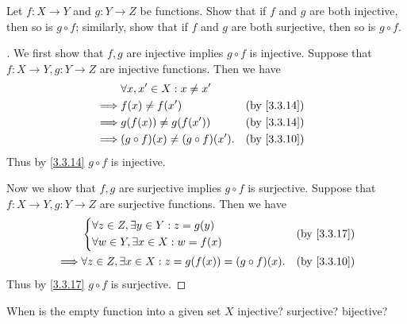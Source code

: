 \begin{ex}\label{ex:3.3.2}
  Let \(f : X \to Y\) and \(g : Y \to Z\) be functions.
  Show that if \(f\) and \(g\) are both injective, then so is \(g \circ f\);
  similarly, show that if \(f\) and \(g\) are both surjective, then so is \(g \circ f\).
\end{ex}

\begin{proof}[]
  We first show that \(f, g\) are injective implies \(g \circ f\) is injective.
  Suppose that \(f : X \to Y, g : Y \to Z\) are injective functions.
  Then we have
  \begin{align*}
             & \forall x, x' \in X : x \neq x'                       \\
    \implies & f(x) \neq f(x')                      &  & \by{3.3.14} \\
    \implies & g(f(x)) \neq g(f(x'))                &  & \by{3.3.14} \\
    \implies & (g \circ f)(x) \neq (g \circ f)(x'). &  & \by{3.3.10}
  \end{align*}
  Thus by \cref{3.3.14} \(g \circ f\) is injective.

  Now we show that \(f, g\) are surjective implies \(g \circ f\) is surjective.
  Suppose that \(f : X \to Y, g : Y \to Z\) are surjective functions.
  Then we have
  \begin{align*}
             & \begin{dcases}
                 \forall z \in Z, \exists y \in Y : z = g(y) \\
                 \forall w \in Y, \exists x \in X : w = f(x)
               \end{dcases}                   &  & \by{3.3.17}                                   \\
    \implies & \forall z \in Z, \exists x \in X : z = g(f(x)) = (g \circ f)(x). &  & \by{3.3.10}
  \end{align*}
  Thus by \cref{3.3.17} \(g \circ f\) is surjective.
\end{proof}

\begin{ex}\label{ex:3.3.3}
  When is the empty function into a given set \(X\) injective?
  surjective?
  bijective?
\end{ex}

